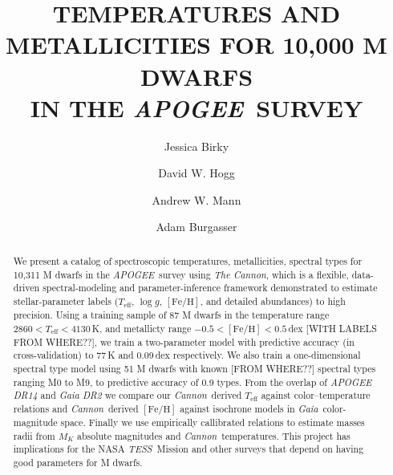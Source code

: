 \documentclass[modern]{aastex62}
\newcommand{\apogee}{\textsl{APOGEE}}
\newcommand{\thecannon}{\textsl{The Cannon}}
\newcommand{\cannon}{\textsl{Cannon}}
\newcommand{\gaia}{\textsl{Gaia}}
\newcommand{\tess}{\textsl{TESS}}
\newcommand{\teff}{T_{\mathrm{eff}}}
\newcommand{\logg}{\log g}
\newcommand{\feh}{[{\mathrm{Fe}/\mathrm{H}}]}
\begin{document}
\raggedbottom\sloppy\sloppypar\frenchspacing

\title{TEMPERATURES AND METALLICITIES FOR 10,000 M DWARFS\\ IN THE \apogee\ SURVEY}


\author[0000-0002-7961-6881]{Jessica Birky}

\author[0000-0003-2866-9403]{David W. Hogg}

\author[0000-0003-3654-1602]{Andrew W. Mann}

\author[0000-0002-6523-9536]{Adam Burgasser}

\begin{abstract}
We present a catalog of spectroscopic temperatures, metallicities,
spectral types for 10,311 M dwarfs in the \apogee\ survey using
\thecannon, which is a flexible, data-driven spectral-modeling and
parameter-inference framework demonstrated to estimate
stellar-parameter labels ($\teff$, $\logg$, $\feh$, and detailed
abundances) to high precision.
Using a training sample of 87 M dwarfs in the temperature range $2860
< \teff < 4130$\,K, and metallicty range $-0.5 < \feh < 0.5$\,dex
[WITH LABELS FROM WHERE??], we train a two-parameter model with
predictive accuracy (in cross-validation) to 77\,K and 0.09\,dex
respectively.
We also train a one-dimensional spectral type model using 51 M dwarfs
with known [FROM WHERE??] spectral types ranging M0 to M9, to predictive accuracy of
0.9 types.
From the overlap of \textsl{APOGEE DR14} and \textsl{Gaia DR2} we
compare our \cannon\ derived $\teff$ against color--temperature
relations and \cannon\ derived $\feh$ against isochrone models in
\gaia\ color-magnitude space.
Finally we use empirically callibrated relations to estimate masses
radii from $M_K$ absolute magnitudes and \cannon\ temperatures.
This project has implications for the NASA \tess\ Mission and other
surveys that depend on having good parameters for M dwarfs.
\end{abstract}
\end{document}
